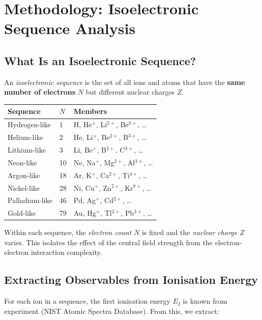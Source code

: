 \section{Methodology: Isoelectronic Sequence Analysis}

\subsection{What Is an Isoelectronic Sequence?}

An \emph{isoelectronic sequence} is the set of all ions and atoms that have the \textbf{same number of electrons} $N$ but different nuclear charges $Z$.

\begin{center}
\begin{tabular}{lll}
\hline
\textbf{Sequence} & $N$ & \textbf{Members} \\
\hline
Hydrogen-like & 1 & H, He$^+$, Li$^{2+}$, Be$^{3+}$, \ldots \\
Helium-like & 2 & He, Li$^+$, Be$^{2+}$, B$^{3+}$, \ldots \\
Lithium-like & 3 & Li, Be$^+$, B$^{2+}$, C$^{3+}$, \ldots \\
Neon-like & 10 & Ne, Na$^+$, Mg$^{2+}$, Al$^{3+}$, \ldots \\
Argon-like & 18 & Ar, K$^+$, Ca$^{2+}$, Ti$^{4+}$, \ldots \\
Nickel-like & 28 & Ni, Cu$^+$, Zn$^{2+}$, Kr$^{8+}$, \ldots \\
Palladium-like & 46 & Pd, Ag$^+$, Cd$^{2+}$, \ldots \\
Gold-like & 79 & Au, Hg$^+$, Tl$^{2+}$, Pb$^{3+}$, \ldots \\
\hline
\end{tabular}
\end{center}

Within each sequence, the \emph{electron count} $N$ is fixed and the \emph{nuclear charge} $Z$ varies.  This isolates the effect of the central field strength from the electron-electron interaction complexity.

\subsection{Extracting Observables from Ionisation Energy}

For each ion in a sequence, the first ionisation energy $E_{I}$ is known from experiment (NIST Atomic Spectra Database).  From this, we extract:

